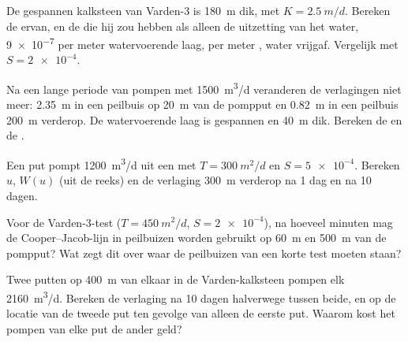\begin{exercise}[$\star$]\label{exo:b3:hydrogeology:4}
De gespannen kalksteen van Varden-3 is \qty{180}{m} dik, met $K =
\qty{2.5}{m/d}$. Bereken de  ervan, en de  die hij zou hebben
als alleen de uitzetting van het water, \num{9e-7} per meter watervoerende laag,
per meter , water vrijgaf. Vergelijk met $S = \num{2e-4}$.
\end{exercise}

\begin{exercise}[$\star\star$]\label{exo:b3:hydrogeology:5}
Na een lange periode van pompen met \qty{1500}{m^3/d} veranderen de verlagingen
niet meer: \qty{2.35}{m} in een peilbuis op \qty{20}{m} van de pompput en
\qty{0.82}{m} in een peilbuis \qty{200}{m} verderop. De watervoerende laag is
gespannen en \qty{40}{m} dik. Bereken de  en de .
\end{exercise}

\begin{exercise}[$\star\star$]\label{exo:b3:hydrogeology:6}
Een put pompt \qty{1200}{m^3/d} uit een  met $T =
\qty{300}{m^2/d}$ en $S = \num{5e-4}$. Bereken $u$, $W(u)$ (uit de
reeks) en de verlaging \qty{300}{m} verderop na 1 dag en na 10 dagen.
\end{exercise}

\begin{exercise}[$\star\star$]\label{exo:b3:hydrogeology:7}
Voor de Varden-3-test ($T = \qty{450}{m^2/d}$, $S = \num{2e-4}$), na
hoeveel minuten mag de Cooper--Jacob-lijn in peilbuizen worden gebruikt
op \qty{60}{m} en \qty{500}{m} van de pompput? Wat zegt dit
over waar de peilbuizen van een korte test moeten staan?
\end{exercise}

\begin{exercise}[$\star\star$]\label{exo:b3:hydrogeology:8}
Twee putten op \qty{400}{m} van elkaar in de Varden-kalksteen pompen elk
\qty{2160}{m^3/d}. Bereken de verlaging na 10 dagen halverwege tussen beide,
en op de locatie van de tweede put ten gevolge van alleen de eerste put. Waarom kost
het pompen van elke put de ander geld?
\end{exercise}

